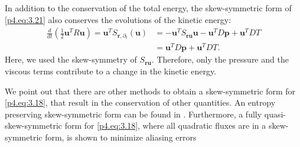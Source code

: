 In addition to the conservation of the total energy, the skew-symmetric form of \eqref{p4.eq:3.21} also conserves the evolutions of the kinetic energy:
\begin{equation} \label{p4.eq:3.26}
\begin{aligned}
	\frac{d}{dt} ( \frac 1 2 \mathbf u^T R\mathbf u) = \mathbf u^T S_{\mathbf r,\partial_t} (\mathbf u) &= -\mathbf u ^T S_{\mathbf r \mathbf u} \mathbf u - \mathbf u^T D \mathbf p + \mathbf u^T DT \\
	&= \mathbf u^T D \mathbf p + \mathbf u^T DT.
\end{aligned}
\end{equation}
Here, we used the skew-symmetry of $S_{\mathbf r \mathbf u}$. Therefore, only the pressure and the viscous terms contribute to a change in the kinetic energy.

We point out that there are other methods to obtain a skew-symmetric form for \eqref{p4.eq:3.18}, that result in the conservation of other quantities. An entropy preserving skew-symmetric form can be found in \cite{sjogreen2010skew}. Furthermore, a fully quasi-skew-symmetric form for \eqref{p4.eq:3.18}, where all quadratic fluxes are in a skew-symmetric form, is shown to minimize aliasing errors \cite{honein2004higher,honein2005numerical}

